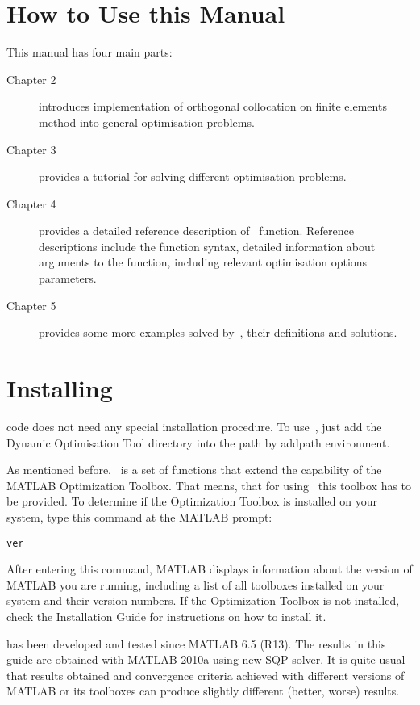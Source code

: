\section{How to Use this Manual}
\label{sec:howtouseman}

This manual has four main parts:
\begin{description}
\item[Chapter 2] introduces implementation of orthogonal collocation
  on finite elements method into general optimisation problems.
\item[Chapter 3] provides a tutorial for solving different
  optimisation problems.
\item[Chapter 4] provides a detailed reference description
  of~ function. Reference descriptions include the
  function syntax, detailed information about arguments to the
  function, including relevant optimisation options parameters.
\item[Chapter 5] provides some more examples solved by~,
  their definitions and solutions.
\end{description}

\section{Installing~}
\label{sec:instdynopt}

 code does not need any special installation procedure. To
use~, just add the Dynamic Optimisation Tool directory
 into the path by addpath environment. 

As mentioned before,~ is a set of functions that extend
the capability of the MATLAB Optimization Toolbox. That means, that
for using~ this toolbox has to be provided. To determine
if the Optimization Toolbox is installed on your system, type this
command at the MATLAB prompt:
\begin{verbatim}
ver
\end{verbatim}
After entering this command, MATLAB displays information about the
version of MATLAB you are running, including a list of all toolboxes
installed on your system and their version numbers.  If the
Optimization Toolbox is not installed, check the Installation Guide
for instructions on how to install it.

 has been developed and tested since MATLAB 6.5 (R13). The
results in this guide are obtained with MATLAB 2010a using new SQP
solver. It is quite usual that results obtained and convergence
criteria achieved with different versions of MATLAB or its toolboxes
can produce slightly different (better, worse) results.




